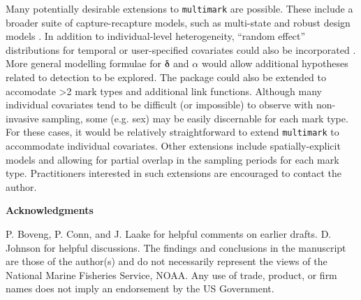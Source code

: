 \documentclass[12pt]{article}
\begin{document}
Many potentially desirable extensions to \verb|multimark| are possible. These include a broader suite of capture-recapture models, such as multi-state and robust design models \citep[e.g.][]{WilliamsEtAl2002}. In addition to individual-level heterogeneity, ``random effect'' distributions for temporal or user-specified covariates could also be incorporated \citep[e.g.][]{LaakeEtAl2013}. More general modelling formulae for ${\boldsymbol \delta}$ and $\alpha$ would allow additional hypotheses related to detection to be explored. The package could also be extended to accomodate >2 mark types and additional link functions. Although many individual covariates tend to be difficult (or impossible) to observe with non-invasive sampling, some (e.g. sex) may be easily discernable for each mark type. For these cases, it would be relatively straightforward to extend \verb|multimark| to accommodate individual covariates. Other extensions include spatially-explicit models \citep[e.g.][]{Royle2015} and allowing for partial overlap in the sampling periods for each mark type. Practitioners interested in such extensions are encouraged to contact the author.

\noindent \textbf{Acknowledgments} 

\noindent P. Boveng, P. Conn, and J. Laake for helpful comments on earlier drafts. D. Johnson for helpful discussions. The findings and conclusions in the manuscript are those of the author(s) and do not necessarily represent the views of the National Marine Fisheries Service, NOAA. Any use of trade, product, or firm names does not imply an endorsement by the US Government.



\end{document}
